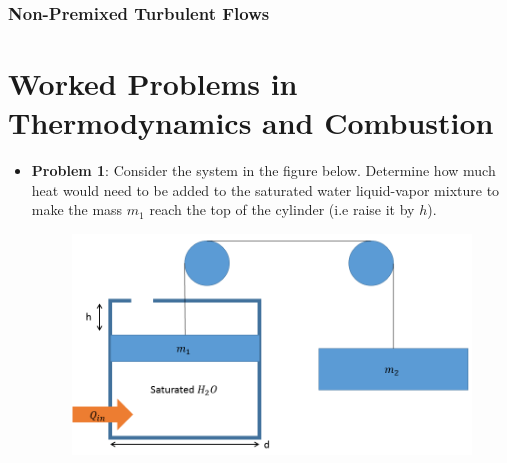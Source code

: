 \documentclass[11pt]{article}
\newcommand{\Item}[1]{\item \textbf{#1}:}
\newcommand{\Problem}[1]{\Item{Problem #1}}
\begin{document}
\subsubsection{Non-Premixed Turbulent Flows}
\newpage
\section{Worked Problems in Thermodynamics and Combustion}
\begin{itemize}
\Problem{1} Consider the system in the figure below. Determine how much heat would need to be added to the saturated water liquid-vapor mixture to make the mass $m_1$ reach the top of the cylinder (i.e raise it by $h$).
\begin{figure}[h]\center\includegraphics[scale=0.5]{Graphics/mass_system.PNG}\end{figure}


\end{itemize}
\end{document}
